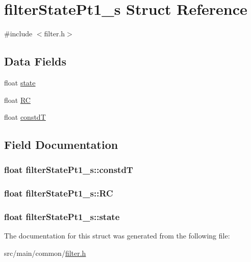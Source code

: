\hypertarget{structfilterStatePt1__s}{\section{filter\+State\+Pt1\+\_\+s Struct Reference}
\label{structfilterStatePt1__s}
}


{\ttfamily \#include $<$filter.\+h$>$}

\subsection*{Data Fields}
\begin{DoxyCompactItemize}
\item 
float \hyperlink{structfilterStatePt1__s_ab46d120a3379ce3124b44552b4fae47a}{state}
\item 
float \hyperlink{structfilterStatePt1__s_a46c069b8ed0549eb3355674cec6dfbb4}{R\+C}
\item 
float \hyperlink{structfilterStatePt1__s_a4e7519c2fe230a5bbcb9f58aa3974955}{constd\+T}
\end{DoxyCompactItemize}


\subsection{Field Documentation}
\hypertarget{structfilterStatePt1__s_a4e7519c2fe230a5bbcb9f58aa3974955}{
\subsubsection[{constd\+T}]{\setlength{\rightskip}{0pt plus 5cm}float filter\+State\+Pt1\+\_\+s\+::constd\+T}}\label{structfilterStatePt1__s_a4e7519c2fe230a5bbcb9f58aa3974955}
\hypertarget{structfilterStatePt1__s_a46c069b8ed0549eb3355674cec6dfbb4}{
\subsubsection[{R\+C}]{\setlength{\rightskip}{0pt plus 5cm}float filter\+State\+Pt1\+\_\+s\+::\+R\+C}}\label{structfilterStatePt1__s_a46c069b8ed0549eb3355674cec6dfbb4}
\hypertarget{structfilterStatePt1__s_ab46d120a3379ce3124b44552b4fae47a}{
\subsubsection[{state}]{\setlength{\rightskip}{0pt plus 5cm}float filter\+State\+Pt1\+\_\+s\+::state}}\label{structfilterStatePt1__s_ab46d120a3379ce3124b44552b4fae47a}


The documentation for this struct was generated from the following file\+:\begin{DoxyCompactItemize}
\item 
src/main/common/\hyperlink{filter_8h}{filter.\+h}\end{DoxyCompactItemize}
